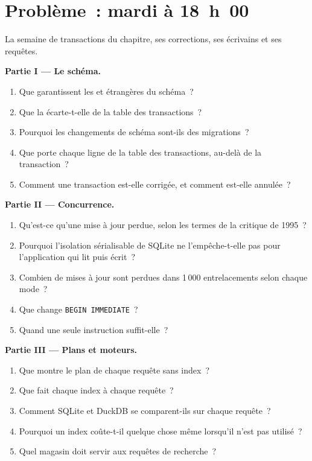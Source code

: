 \section{Problème~: mardi à 18~h~00}

\begin{problem}\label{pb:pl:databases-and-sql:1}
La semaine de transactions du chapitre, ses corrections, ses écrivains et ses requêtes.

\medskip\noindent\textbf{Partie I --- Le schéma.}
\begin{enumerate}
\item Que garantissent les  et étrangères du schéma~?
\item Que la  écarte-t-elle de la table des transactions~?
\item Pourquoi les changements de schéma sont-ils des migrations~?
\item Que porte chaque ligne de la table des transactions, au-delà de la transaction~?
\item Comment une transaction est-elle corrigée, et comment est-elle annulée~?
\end{enumerate}

\medskip\noindent\textbf{Partie II --- Concurrence.}
\begin{enumerate}[resume]
\item Qu'est-ce qu'une mise à jour perdue, selon les termes de la critique de 1995~?
\item Pourquoi l'isolation sérialisable de SQLite ne l'empêche-t-elle pas pour l'application qui lit puis écrit~?
\item Combien de mises à jour sont perdues dans 1\,000 entrelacements selon chaque mode~?
\item Que change \texttt{BEGIN IMMEDIATE}~?
\item Quand une seule instruction suffit-elle~?
\end{enumerate}

\medskip\noindent\textbf{Partie III --- Plans et moteurs.}
\begin{enumerate}[resume]
\item Que montre le plan de chaque requête sans index~?
\item Que fait chaque index à chaque requête~?
\item Comment SQLite et DuckDB se comparent-ils sur chaque requête~?
\item Pourquoi un index coûte-t-il quelque chose même lorsqu'il n'est pas utilisé~?
\item Quel magasin doit servir aux requêtes de recherche~?
\end{enumerate}


\end{problem}
